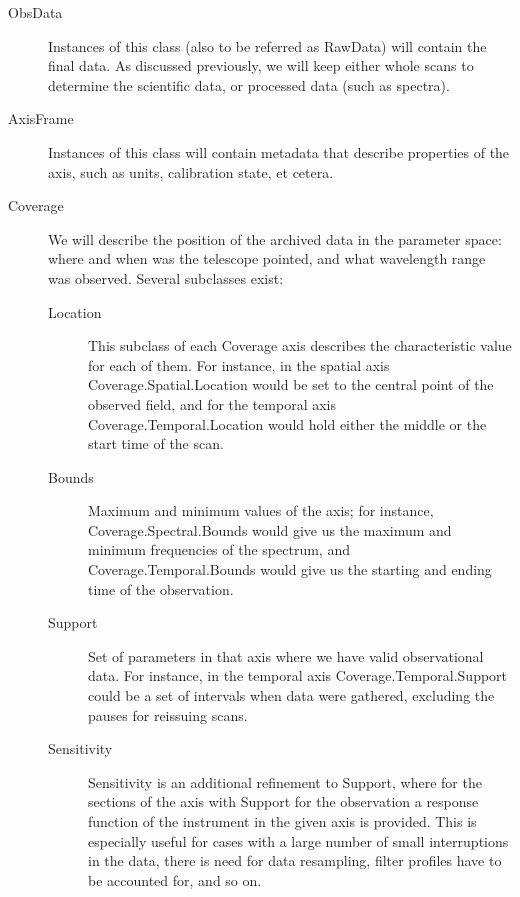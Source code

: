 		\begin{description}
			\item[ObsData] Instances of this class (also to be
			referred as RawData) will contain the final data. As
			discussed previously, we will keep either whole scans
			to determine the scientific data, or processed data
			(such as spectra).
		
			 \item[AxisFrame] Instances of this class will contain
			metadata that describe properties of the axis,
			such as units, calibration state, et cetera.
		
			 \item[Coverage] We will describe the position of the
			archived data in the parameter space: where and when was
			the telescope pointed, and what wavelength range was
			observed. Several subclasses exist:
		
			\begin{description}
				\item[Location] This subclass of each Coverage
				axis
				describes the characteristic value for each of
				them.
				For instance, in the spatial axis
				Coverage.Spatial.Location would be set to
				the central point of the observed field, and for
				the temporal axis
				Coverage.Temporal.Location would hold 
				either the middle or the start
				time of the scan.
				
				\item[Bounds] Maximum and minimum values
				of the axis; for instance, Coverage.Spectral.Bounds
				would give us the maximum and minimum frequencies
				of the spectrum, and Coverage.Tem\-po\-ral.Bounds
				would give us the starting and ending time of the
				observation.
				
				\item[Support] Set of parameters in that
				axis where we have valid observational data. For
				instance, in the temporal axis
				Coverage.Tem\-po\-ral.Sup\-port could be
				a set of intervals when data were gathered,
				excluding the pauses for reissuing scans.
				
				\item[Sensitivity] Sensitivity is an
				additional refinement to Support, where for the
				sections of the axis with Support for the observation
				a response function of the instrument in
				the given axis is provided.
				This is especially useful for cases with a large
				number of small interruptions in the data, there is
				need for data resampling, filter
				profiles have to be accounted for, and so on.
			\end{description}
			

\end{description}
